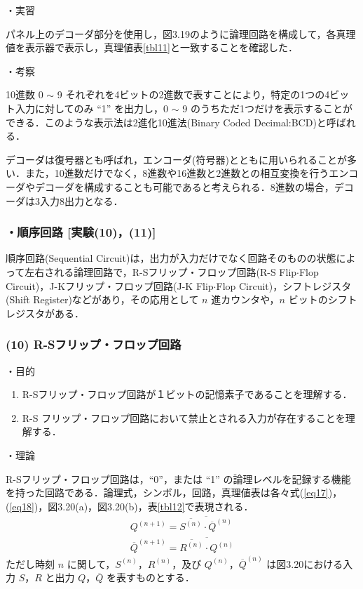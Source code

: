 \vspace{7mm}
\noindent
・実習 \vspace{2mm}

パネル上のデコーダ部分を使用し，図3.19のように論理回路を構成して，各真理値を表示器で表示し，真理値表\ref{tbl11}と一致することを確認した．

\vspace{7mm}
\noindent
・考察 \vspace{2mm}

10進数 0 $\sim$ 9 それぞれを4ビットの2進数で表すことにより，特定の1つの4ビット入力に対してのみ ``1'' を出力し，0 $\sim$ 9 のうちただ1つだけを表示することができる．このような表示法は2進化10進法(Binary Coded Decimal:BCD)と呼ばれる．

デコーダは復号器とも呼ばれ，エンコーダ(符号器)とともに用いられることが多い．また，10進数だけでなく，8進数や16進数と2進数との相互変換を行うエンコーダやデコーダを構成することも可能であると考えられる．8進数の場合，デコーダは3入力8出力となる．

\subsubsection*{・順序回路 [実験(10)，(11)]}

順序回路(Sequential Circuit)は，出力が入力だけでなく回路そのものの状態によって左右される論理回路で，R-Sフリップ・フロップ回路(R-S Flip$\cdot$Flop Circuit)，J-Kフリップ・フロップ回路(J-K Flip$\cdot$Flop Circuit)，シフトレジスタ(Shift Register)などがあり，その応用として $n$ 進カウンタや，$n$ ビットのシフトレジスタがある．

\subsubsection*{(10) R-Sフリップ・フロップ回路}
\noindent
・目的 \vspace{2mm}

\begin{enumerate}
    \item R-Sフリップ・フロップ回路が１ビットの記憶素子であることを理解する．
    \item R-S フリップ・フロップ回路において禁止とされる入力が存在することを理解する．
\end{enumerate}

\vspace{7mm}
\noindent
・理論 \vspace{2mm}

R-Sフリップ・フロップ回路は，``0''，または ``1'' の論理レベルを記録する機能を持った回路である．論理式，シンボル，回路，真理値表は各々式(\ref{eq17})，(\ref{eq18})，図3.20(a)，図3.20(b)，表\ref{tbl12}で表現される．
\begin{eqnarray}
    Q^{(n+1)}=\overline{\overline{S^{(n)}} \cdot {\overline{Q}}^{(n)}} \label{eq17} \\
    {\overline{Q}}^{(n+1)}=\overline{\overline{R^{(n)}} \cdot Q^{(n)}} \label{eq18}
\end{eqnarray}
ただし時刻 $n$ に関して，$S^{(n)}$，$R^{(n)}$，及び $Q^{(n)}$，${\overline{Q}}^{(n)}$ は図3.20における入力 $S$，$R$ と出力 $Q$，$\overline{Q}$ を表すものとする．

